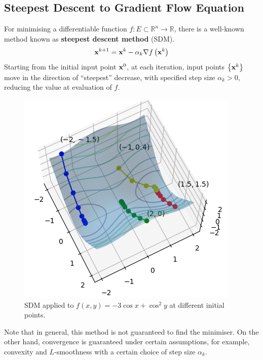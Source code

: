 \documentclass[../dissertation.tex]{subfiles}
\begin{document}
\subsection{Steepest Descent to Gradient Flow Equation}
For minimising a differentiable function $f:E \subset \mathbb{R}^n \rightarrow \mathbb{R}$, there is a well-known method known as \textbf{steepest descent method} (SDM)\cite{doi:10.1137/1.9781611974997.ch8}.
\begin{equation}
    \mathbf{x}^{k+1} = \mathbf{x}^{k} - \alpha_k \nabla f \left( \mathbf{x}^{k} \right)
    \label{equ: SDM}
\end{equation}
Starting from the initial input point $\mathbf{x}^{0}$, at each iteration, input points $\left\{ \mathbf{x}^{k} \right\}$ move in the direction of ``steepest'' decrease,
with specified step size $\alpha_k > 0$,
reducing the value at evaluation of $f$.
\begin{figure}[tbp]
    \centering
    \includegraphics[scale=0.6]{sections/preambleImgs/sdm}
    \caption{SDM applied to $f(x,y) = -3 \cos x + \cos^2 y$ at different initial points.}
    \label{fig: SDM}
\end{figure}
Note that in general, this method is not guaranteed to find the minimiser.
On the other hand, convergence is guaranteed under certain assumptions, for example, convexity and $L$-smoothness with a certain choice of step size $\alpha_k$.
\end{document}
